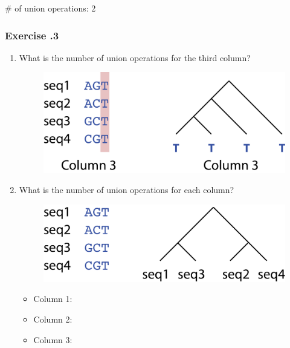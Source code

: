 \# of union operations: 2

%
%
\subsubsection*{Exercise \thesection.3}
\begin{enumerate}
\item What is the number of union operations for the third column?
\begin{figure}[H]
  \centering
      \includegraphics[width=0.4 \textwidth]{fig09/mp_exercise_1.png}
\end{figure}

\item What is the number of union operations for each column?
\begin{figure}[H]
  \centering
      \includegraphics[width=0.4 \textwidth]{fig09/mp_exercise_2.png}
\end{figure}

\begin{itemize}
\item Column 1:
\item Column 2:
\item Column 3:
\end{itemize}

\end{enumerate}

\bigskip 

%
